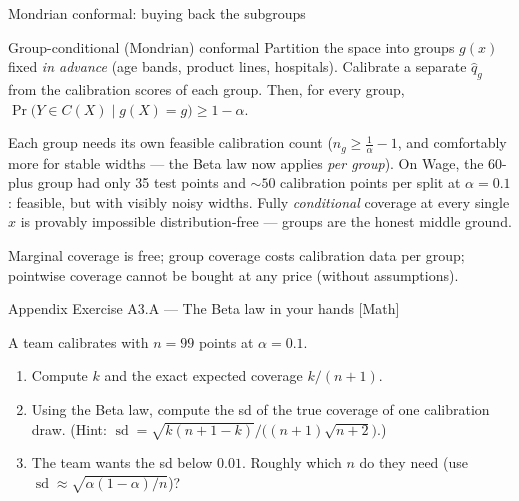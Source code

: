\documentclass[aspectratio=169,11pt]{beamer}
\begin{document}
\begin{frame}{Mondrian conformal: buying back the subgroups}
  \footnotesize
  \begin{block}{Group-conditional (Mondrian) conformal}
    Partition the space into groups $g(x)$ fixed \emph{in advance} (age bands, product
    lines, hospitals). Calibrate a separate $\hat q_g$ from the calibration scores of
    each group. Then, for every group,
    $\Pr\big(Y \in C(X) \mid g(X) = g\big) \ge 1 - \alpha$.
  \end{block}
  \begin{readme}
    Each group needs its own feasible calibration count
    ($n_g \ge \tfrac{1}{\alpha} - 1$, and comfortably more for stable widths --- the
    Beta law now applies \emph{per group}). On Wage, the 60-plus group had only 35
    test points and $\sim 50$ calibration points per split at $\alpha = 0.1$: feasible,
    but with visibly noisy widths. Fully \emph{conditional} coverage at every single
    $x$ is provably impossible distribution-free --- groups are the honest middle
    ground.
  \end{readme}
  \begin{takeaway}
    Marginal coverage is free; group coverage costs calibration data per group;
    pointwise coverage cannot be bought at any price (without assumptions).
  \end{takeaway}
\end{frame}

\begin{frame}{Appendix Exercise A3.A --- The Beta law in your hands [Math]}
\begin{exercise}
  A team calibrates with $n = 99$ points at $\alpha = 0.1$.
  \begin{enumerate}
    \item Compute $k$ and the exact expected coverage $k/(n+1)$.
    \item Using the Beta law, compute the sd of the true coverage of one calibration
          draw. (Hint: $\operatorname{sd} = \sqrt{k(n+1-k)}\big/\big((n+1)\sqrt{n+2}\big)$.)
    \item The team wants the sd below $0.01$. Roughly which $n$ do they need
          (use $\operatorname{sd} \approx \sqrt{\alpha(1-\alpha)/n}$)?
  \end{enumerate}
\end{exercise}
\end{frame}
\end{document}
